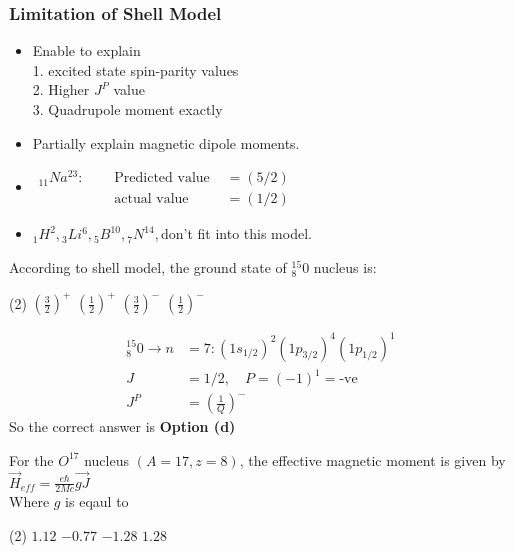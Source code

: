 \subsubsection{Limitation of Shell Model}
\begin{itemize}
	\item Enable to explain \\
	1. excited state spin-parity values\\
	2. Higher $J^P$ value \\
	3. Quadrupole moment exactly
	\item Partially explain magnetic dipole moments.
	\item $\begin{aligned} {}_{11}Na^{23}: \quad& \text { Predicted value } &=(5 / 2) \\ & \text { actual value } &=(1 / 2) \end{aligned}$
	\item ${}_1H^2, {}_3Li^6, {}_5B^{10}, {}_7N^{14},  $don't fit into this model.
\end{itemize}
\begin{exercise}
	According to shell model, the ground state of ${ }_{8}^{15} 0$ nucleus is:
	 \begin{tasks}(2)
		\task[\textbf{a.}]$\left(\frac{3}{2}\right)^{+}$
		\task[\textbf{b.}] $\left(\frac{1}{2}\right)^{+}$
		\task[\textbf{c.}] $\left(\frac{3}{2}\right)^{-}$
		\task[\textbf{d.}] $\left(\frac{1}{2}\right)^{-}$
	\end{tasks}
\end{exercise}
\begin{answer}
	\begin{align*}
	{ }_{8}^{15} 0 \rightarrow n&=7:\left(1 s_{1 / 2}\right)^{2}\left(1 p_{3 / 2}\right)^{4}\left(1 p_{1 / 2}\right)^{1}\\
	J&=1 / 2, \quad P=(-1)^{1}=\text {-ve }\\
	J^{P}&=\left(\frac{1}{Q}\right)^{-}
	\end{align*}
	So the correct answer is \textbf{Option (d)}
\end{answer}
\begin{exercise}
	For the $O^{17}$ nucleus $(A=17, z=8)$, the effective magnetic moment is given by \\
	$\vec{H}_{e f f}=\frac{e \hbar}{2 M c} \overrightarrow{g J}$\\
	 Where $g$ is eqaul to 
	 \begin{tasks}(2)
	 	\task[\textbf{a.}]$1.12$
	 	\task[\textbf{b.}] $-0.77$
	 	\task[\textbf{c.}]$-1.28$
	 	\task[\textbf{d.}] $1.28$ 
	 \end{tasks}
\end{exercise}

